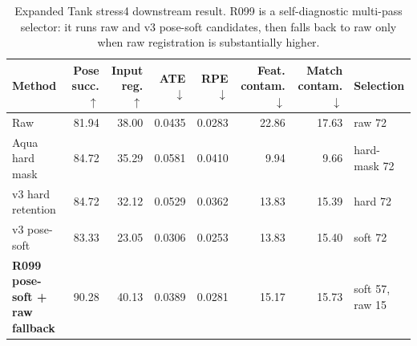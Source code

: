 \begin{table}[t]
\centering
\small
\caption{Expanded Tank stress4 downstream result. R099 is a self-diagnostic multi-pass selector: it runs raw and v3 pose-soft candidates, then falls back to raw only when raw registration is substantially higher.}
\label{tab:aqua_tank_stress4_r099}
\begin{tabular}{lrrrrrrl}
\toprule
Method & Pose succ. $\uparrow$ & Input reg. $\uparrow$ & ATE $\downarrow$ & RPE $\downarrow$ & Feat. contam. $\downarrow$ & Match contam. $\downarrow$ & Selection \\
\midrule
Raw & 81.94 & 38.00 & 0.0435 & 0.0283 & 22.86 & 17.63 & raw 72 \\
Aqua hard mask & 84.72 & 35.29 & 0.0581 & 0.0410 & 9.94 & 9.66 & hard-mask 72 \\
v3 hard retention & 84.72 & 32.12 & 0.0529 & 0.0362 & 13.83 & 15.39 & hard 72 \\
v3 pose-soft & 83.33 & 23.05 & 0.0306 & 0.0253 & 13.83 & 15.40 & soft 72 \\
\textbf{R099 pose-soft + raw fallback} & 90.28 & 40.13 & 0.0389 & 0.0281 & 15.17 & 15.73 & soft 57, raw 15 \\
\bottomrule
\end{tabular}
\end{table}
